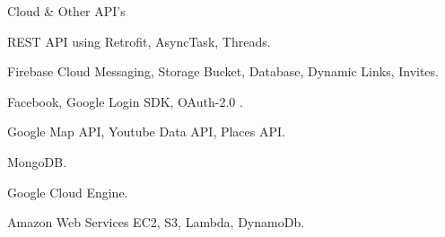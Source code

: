 \begin{cventries}
  \cventry
    {} %
    {Cloud \& Other API's} %
    {} %
    {} %
    {
      \begin{cvitems} %
        \item{REST API using Retrofit, AsyncTask, Threads.}
        \item{Firebase Cloud Messaging, Storage Bucket, Database, Dynamic Links, Invites.}
        \item {Facebook, Google Login SDK, OAuth-2.0 .}
        \item{Google Map API, Youtube Data API, Places API.}
           \item{MongoDB.}
           \item{Google Cloud Engine.}
           \item{Amazon Web Services EC2, S3, Lambda, DynamoDb.}
      \end{cvitems}
    }
\end{cventries}
